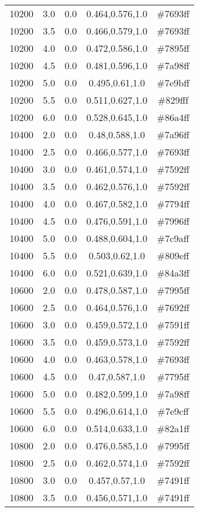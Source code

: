 \begin{tabular}{ccccc}
10200 & 3.0 & 0.0 & 0.464,0.576,1.0 & \#7693ff \\ 
10200 & 3.5 & 0.0 & 0.466,0.579,1.0 & \#7693ff \\ 
10200 & 4.0 & 0.0 & 0.472,0.586,1.0 & \#7895ff \\ 
10200 & 4.5 & 0.0 & 0.481,0.596,1.0 & \#7a98ff \\ 
10200 & 5.0 & 0.0 & 0.495,0.61,1.0 & \#7e9bff \\ 
10200 & 5.5 & 0.0 & 0.511,0.627,1.0 & \#829fff \\ 
10200 & 6.0 & 0.0 & 0.528,0.645,1.0 & \#86a4ff \\ 
10400 & 2.0 & 0.0 & 0.48,0.588,1.0 & \#7a96ff \\ 
10400 & 2.5 & 0.0 & 0.466,0.577,1.0 & \#7693ff \\ 
10400 & 3.0 & 0.0 & 0.461,0.574,1.0 & \#7592ff \\ 
10400 & 3.5 & 0.0 & 0.462,0.576,1.0 & \#7592ff \\ 
10400 & 4.0 & 0.0 & 0.467,0.582,1.0 & \#7794ff \\ 
10400 & 4.5 & 0.0 & 0.476,0.591,1.0 & \#7996ff \\ 
10400 & 5.0 & 0.0 & 0.488,0.604,1.0 & \#7c9aff \\ 
10400 & 5.5 & 0.0 & 0.503,0.62,1.0 & \#809eff \\ 
10400 & 6.0 & 0.0 & 0.521,0.639,1.0 & \#84a3ff \\ 
10600 & 2.0 & 0.0 & 0.478,0.587,1.0 & \#7995ff \\ 
10600 & 2.5 & 0.0 & 0.464,0.576,1.0 & \#7692ff \\ 
10600 & 3.0 & 0.0 & 0.459,0.572,1.0 & \#7591ff \\ 
10600 & 3.5 & 0.0 & 0.459,0.573,1.0 & \#7592ff \\ 
10600 & 4.0 & 0.0 & 0.463,0.578,1.0 & \#7693ff \\ 
10600 & 4.5 & 0.0 & 0.47,0.587,1.0 & \#7795ff \\ 
10600 & 5.0 & 0.0 & 0.482,0.599,1.0 & \#7a98ff \\ 
10600 & 5.5 & 0.0 & 0.496,0.614,1.0 & \#7e9cff \\ 
10600 & 6.0 & 0.0 & 0.514,0.633,1.0 & \#82a1ff \\ 
10800 & 2.0 & 0.0 & 0.476,0.585,1.0 & \#7995ff \\ 
10800 & 2.5 & 0.0 & 0.462,0.574,1.0 & \#7592ff \\ 
10800 & 3.0 & 0.0 & 0.457,0.57,1.0 & \#7491ff \\ 
10800 & 3.5 & 0.0 & 0.456,0.571,1.0 & \#7491ff \\ 

\end{tabular}
